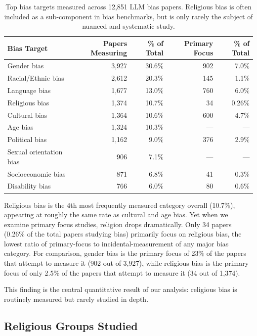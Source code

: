 \documentclass[]{fairmeta}
\begin{document}
\begin{table}[htbp]
\centering
\caption{Top bias targets measured across 12,851 LLM bias papers. Religious bias is often included as a sub-component in bias benchmarks, but is only rarely the subject of nuanced and systematic study.}
\label{tab:bias_targets}
\begin{tabular}{lrrrr}
\toprule
\textbf{Bias Target} & \textbf{Papers Measuring} & \textbf{\% of Total} & \textbf{Primary Focus} & \textbf{\% of Total} \\
\midrule
Gender bias & 3,927 & 30.6\% & 902 & 7.0\% \\
Racial/Ethnic bias & 2,612 & 20.3\% & 145 & 1.1\% \\
Language bias & 1,677 & 13.0\% & 760 & 6.0\% \\
Religious bias & 1,374 & 10.7\% & 34 & 0.26\% \\
Cultural bias & 1,364 & 10.6\% & 600 & 4.7\% \\
Age bias & 1,324 & 10.3\% & --- & --- \\
Political bias & 1,162 & 9.0\% & 376 & 2.9\% \\
Sexual orientation bias & 906 & 7.1\% & --- & --- \\
Socioeconomic bias & 871 & 6.8\% & 41 & 0.3\% \\
Disability bias & 766 & 6.0\% & 80 & 0.6\% \\
\bottomrule
\end{tabular}
\end{table}

Religious bias is the 4th most frequently measured category overall (10.7\%), appearing at roughly the same rate as cultural and age bias. Yet when we examine primary focus studies, religion drops dramatically. Only 34 papers (0.26\% of the total papers studying bias) primarily focus on religious bias, the lowest ratio of primary-focus to incidental-measurement of any major bias category. For comparison, gender bias is the primary focus of 23\% of the papers that attempt to measure it (902 out of 3,927), while religious bias is the primary focus of only 2.5\% of the papers that attempt to measure it (34 out of 1,374).

This finding is the central quantitative result of our analysis: religious bias is routinely measured but rarely studied in depth.

\subsection{Religious Groups Studied}
\end{document}
